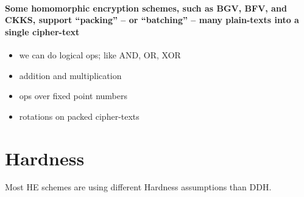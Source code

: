 \paragraph{Some homomorphic encryption schemes, such as BGV, BFV, and CKKS,
support \textquotedblleft packing\textquotedblright{} -- or \textquotedblleft batching\textquotedblright{}
-- many plain-texts into a single cipher-text}
\begin{itemize}
\item we can do logical ops; like AND, OR, XOR
\item addition and multiplication
\item ops over fixed point numbers
\item rotations on packed cipher-texts
\end{itemize}

\section{Hardness}

Most HE schemes are using different Hardness assumptions than DDH.

